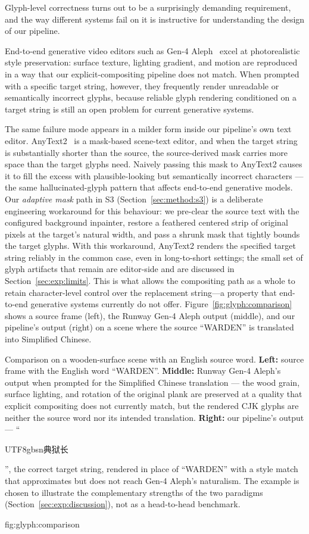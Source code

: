 Glyph-level correctness turns out to be a surprisingly demanding
requirement, and the way different systems fail on it is
instructive for understanding the design of our pipeline.

End-to-end generative video editors such as
Gen-4 Aleph~\citep{runway2025aleph} excel at photorealistic style
preservation: surface texture, lighting gradient, and motion are
reproduced in a way that our explicit-compositing pipeline does not
match. When prompted with a specific target string, however, they
frequently render unreadable or semantically incorrect glyphs,
because reliable glyph rendering conditioned on a target string is
still an open problem for current generative systems.

The same failure mode appears in a milder form inside our
pipeline's own text editor. AnyText2~\citep{tuo2025anytext2} is a
mask-based scene-text editor, and when the target string is
substantially shorter than the source, the source-derived mask
carries more space than the target glyphs need. Naively passing
this mask to AnyText2 causes it to fill the excess with
plausible-looking but semantically incorrect characters --- the same
hallucinated-glyph pattern that affects end-to-end generative
models. Our \emph{adaptive mask} path in S3
(Section~\ref{sec:method:s3}) is a deliberate engineering workaround
for this behaviour: we pre-clear the source text with the
configured background inpainter, restore a feathered centered strip
of original pixels at the target's natural width, and pass a shrunk
mask that tightly bounds the target glyphs. With this workaround,
AnyText2 renders the specified target string reliably in the
common case, even in long-to-short settings; the small set of
glyph artifacts that remain are editor-side and are discussed in
Section~\ref{sec:exp:limits}. This is what allows the compositing
path as a whole to retain character-level control over the
replacement string---a property that end-to-end generative systems
currently do not offer.
Figure~\ref{fig:glyph:comparison} shows a source frame (left), the
Runway Gen-4 Aleph output (middle), and our pipeline's output
(right) on a scene where the source ``WARDEN'' is translated into
Simplified Chinese.

%
  {Comparison on a wooden-surface scene with an English source
   word.
   \textbf{Left:} source frame with the English word ``WARDEN''.
   \textbf{Middle:} Runway Gen-4 Aleph's output when prompted for
   the Simplified Chinese translation --- the wood grain, surface
   lighting, and rotation of the original plank are preserved at a
   quality that explicit compositing does not currently match, but
   the rendered CJK glyphs are neither the source word nor its
   intended translation.
   \textbf{Right:} our pipeline's output ---
   ``\begin{CJK*}{UTF8}{gbsn}典狱长\end{CJK*}'', the correct
   target string, rendered in place of ``WARDEN'' with a style
   match that approximates but does not reach Gen-4 Aleph's
   naturalism.
   The example is chosen to illustrate the complementary strengths
   of the two paradigms (Section~\ref{sec:exp:discussion}), not as
   a head-to-head benchmark.}%
  {fig:glyph:comparison}

